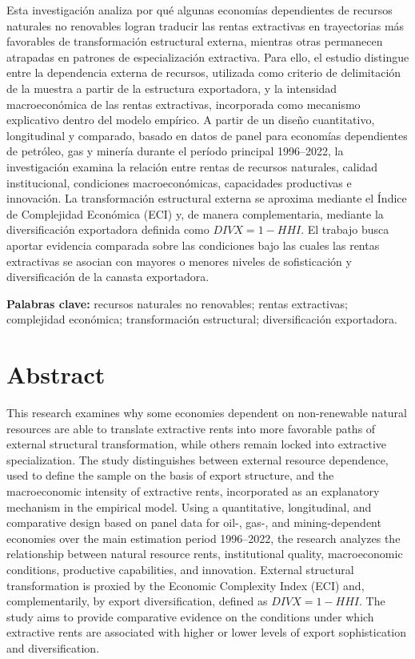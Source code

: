 \documentclass[12pt,a4paper]{report}
\begin{document}
	Esta investigación analiza por qué algunas economías dependientes de recursos naturales no renovables logran traducir las rentas extractivas en trayectorias más favorables de transformación estructural externa, mientras otras permanecen atrapadas en patrones de especialización extractiva. Para ello, el estudio distingue entre la dependencia externa de recursos, utilizada como criterio de delimitación de la muestra a partir de la estructura exportadora, y la intensidad macroeconómica de las rentas extractivas, incorporada como mecanismo explicativo dentro del modelo empírico. A partir de un diseño cuantitativo, longitudinal y comparado, basado en datos de panel para economías dependientes de petróleo, gas y minería durante el período principal 1996–2022, la investigación examina la relación entre rentas de recursos naturales, calidad institucional, condiciones macroeconómicas, capacidades productivas e innovación. La transformación estructural externa se aproxima mediante el Índice de Complejidad Económica (ECI) y, de manera complementaria, mediante la diversificación exportadora definida como $DIVX=1-HHI$. El trabajo busca aportar evidencia comparada sobre las condiciones bajo las cuales las rentas extractivas se asocian con mayores o menores niveles de sofisticación y diversificación de la canasta exportadora.

	\noindent\textbf{Palabras clave:} recursos naturales no renovables; rentas extractivas; complejidad económica; transformación estructural; diversificación exportadora.

	\section*{Abstract}
	\label{chap:abstract}

	This research examines why some economies dependent on non-renewable natural resources are able to translate extractive rents into more favorable paths of external structural transformation, while others remain locked into extractive specialization. The study distinguishes between external resource dependence, used to define the sample on the basis of export structure, and the macroeconomic intensity of extractive rents, incorporated as an explanatory mechanism in the empirical model. Using a quantitative, longitudinal, and comparative design based on panel data for oil-, gas-, and mining-dependent economies over the main estimation period 1996–2022, the research analyzes the relationship between natural resource rents, institutional quality, macroeconomic conditions, productive capabilities, and innovation. External structural transformation is proxied by the Economic Complexity Index (ECI) and, complementarily, by export diversification, defined as $DIVX=1-HHI$. The study aims to provide comparative evidence on the conditions under which extractive rents are associated with higher or lower levels of export sophistication and diversification.
\end{document}
